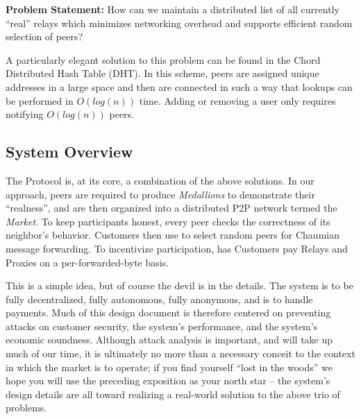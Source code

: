 \textbf{Problem Statement:} How can we maintain a distributed list of
all currently ``real'' relays which minimizes networking overhead and
supports efficient random selection of peers?

A particularly elegant solution to this problem can be found in the
Chord\cite{CHORD} Distributed Hash Table (DHT). In this scheme, peers
are assigned unique addresses in a large space and then are connected
in such a way that lookups can be performed in $O(log(n))$ time. Adding
or removing a user only requires notifying $O(log(n))$ peers.

\subsection*{System Overview}

The \Orchid{} Protocol is, at its core, a combination of the above
solutions. In our approach, peers are required to
produce \emph{Medallions} to demonstrate their ``realness'', and are
then organized into a distributed P2P network termed
the \emph{\Orchid{} Market}. To keep \tOM{} participants honest, every
peer checks the correctness of its neighbor's behavior. Customers then
use \tOM{} to select random peers for Chaumian message forwarding. To
incentivize participation, \tOM{} has Customers pay Relays and Proxies
on a per-forwarded-byte basis.

This is a simple idea, but of course the devil is in the details. The
system is to be fully decentralized, fully autonomous, fully
anonymous, and is to handle payments. Much of this design document is
therefore centered on preventing attacks on customer security, the
system's performance, and the system's economic soundness. Although
attack analysis is important, and will take up much of our time, it is
ultimately no more than a necessary conceit to the context in which
the market is to operate; if you find yourself ``lost in the woods''
we hope you will use the preceding exposition as your north star --
the system's design details are all toward realizing a real-world
solution to the above trio of problems.
